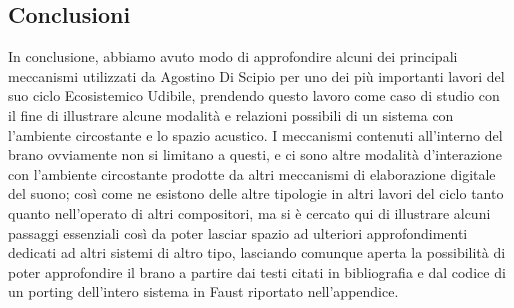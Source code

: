 \subsection{Conclusioni}
\label{sec:Conclusioni}

In conclusione, abbiamo avuto modo di approfondire alcuni dei principali meccanismi 
utilizzati da Agostino Di Scipio per uno dei più importanti lavori del suo ciclo Ecosistemico Udibile,
prendendo questo lavoro come caso di studio con il fine di illustrare alcune modalità e relazioni possibili 
di un sistema con l'ambiente circostante e lo spazio acustico.
I meccanismi contenuti all'interno del brano ovviamente non si limitano a questi,
e ci sono altre modalità d'interazione con l'ambiente circostante prodotte da altri meccanismi di elaborazione
digitale del suono; così come ne esistono delle altre tipologie in altri lavori del ciclo tanto quanto 
nell'operato di altri compositori, ma si è cercato qui di illustrare alcuni passaggi 
essenziali così da poter lasciar spazio ad ulteriori approfondimenti dedicati ad altri sistemi di 
altro tipo, lasciando comunque aperta la possibilità di poter approfondire il brano a partire
dai testi citati in bibliografia e dal codice di un porting dell'intero sistema in Faust 
riportato nell'appendice.